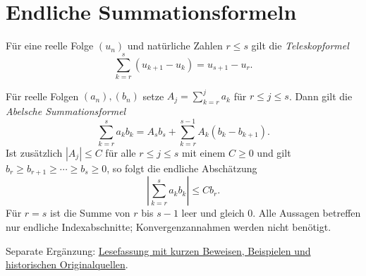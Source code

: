 \clearpage
\section{Endliche Summationsformeln}

\begin{theorem}
\label{b21guide:thm:finite-summation}
Für eine reelle Folge $(u_n)$ und natürliche Zahlen $r\leq s$ gilt
die \emph{Teleskopformel}
\[
 \sum_{k=r}^{s}(u_{k+1}-u_k)=u_{s+1}-u_r.
\]

Für reelle Folgen $(a_n),(b_n)$ setze
$A_j=\sum_{k=r}^{j}a_k$ für $r\leq j\leq s$.
Dann gilt die \emph{Abelsche Summationsformel}
\[
 \sum_{k=r}^{s}a_kb_k
 =A_sb_s+\sum_{k=r}^{s-1}A_k(b_k-b_{k+1}).
\]
Ist zusätzlich $|A_j|\leq C$ für alle $r\leq j\leq s$
mit einem $C\geq0$ und gilt
$b_r\geq b_{r+1}\geq\cdots\geq b_s\geq0$, so folgt die
endliche Abschätzung
\[
 \left|\sum_{k=r}^{s}a_kb_k\right|\leq Cb_r.
\]
Für $r=s$ ist die Summe von $r$ bis $s-1$ leer und gleich $0$.
Alle Aussagen betreffen nur endliche Indexabschnitte;
Konvergenzannahmen werden nicht benötigt.
\end{theorem}

Separate Ergänzung: \href{../abel/_B21-abel-reading.pdf\#abel.reading}{Lesefassung mit kurzen Beweisen, Beispielen und historischen Originalquellen}.
